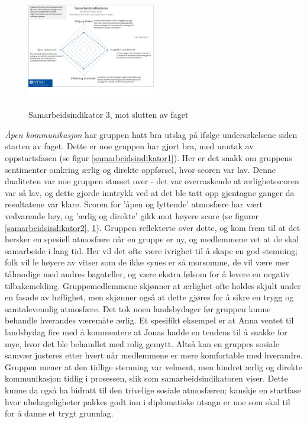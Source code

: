 \begin{figure}[h!]
  \caption{Samarbeidsindikator 3, mot slutten av faget}
  \centering
    \includegraphics[width=0.5\textwidth]{Bilder/samarbeidsindikator_3.jpg}\label{samarbeidsindikator3}
\end{figure}

\emph{Åpen kommunikasjon} har gruppen hatt bra utslag på ifølge undersøkelsene siden starten av faget. 
Dette er noe gruppen har gjort bra, med unntak av oppstartsfasen (se figur \ref{samarbeidsindikator1}).
Her er det snakk om gruppens sentimenter omkring ærlig og direkte oppførsel, hvor scoren var lav.
Denne dualiteten var noe gruppen stusset over - det var overraskende at ærlighetsscoren var så lav, og dette gjorde inntrykk ved at det ble tatt opp gjentagne ganger da resultatene var klare.
Scoren for 'åpen og lyttende' atmosfære har vært vedvarende høy, og 'ærlig og direkte' gikk mot høyere score (se figurer \ref{samarbeidsindikator2}, \ref{samarbeidsindikator3}).
Gruppen reflekterte over dette, og kom frem til at det hersker en spesiell atmosfære når en gruppe er ny, og medlemmene vet at de skal samarbeide i lang tid.
Her vil det ofte være ivrighet til å skape en god stemning; folk vil le høyere av vitser som de ikke synes er så morsomme, de vil være mer tålmodige med andres bagateller, og være ekstra følsom for å levere en negativ tilbakemelding.
Gruppemedlemmene skjønner at ærlighet ofte holdes skjult under en fasade av høflighet, men skjønner også at dette gjøres for å sikre en trygg og samtalevennlig atmosfære. Det tok noen landsbydager før gruppen kunne behandle hverandes væremåte ærlig.
Et spesifikt eksempel er at Anna ventet til landsbydag fire med å kommentere at Jonas hadde en tendens til å snakke for mye, hvor det ble behandlet med rolig gemytt. 
Altså kan en gruppes sosiale samvær justeres etter hvert når medlemmene er mere komfortable med hverandre. 
Gruppen mener at den tidlige stemning var velment, men hindret ærlig og direkte kommunikasjon tidlig i prosessen, slik som samarbeidsindikatoren viser. 
Dette kunne da også ha bidratt til den trivelige sosiale atmosfæren; kanskje en startfase hvor ubehageligheter pakkes godt inn i diplomatiske utsagn er noe som skal til for å danne et trygt grunnlag.
